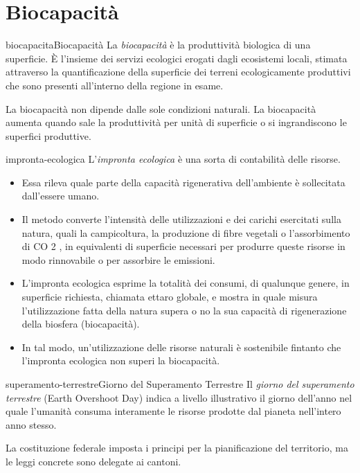 \documentclass[preview]{standalone}
\begin{document}
\genpage

\section{Biocapacità}

\begin{snippetdefinition}{biocapacita}{Biocapacità}
    La \textit{biocapacità} è la produttività biologica di una superficie. È
    l'insieme dei servizi ecologici erogati dagli ecosistemi locali, stimata
    attraverso la quantificazione della superficie dei terreni
    ecologicamente produttivi che sono presenti all'interno della regione
    in esame.
\end{snippetdefinition}

\begin{plainhtml}
    La biocapacità non dipende dalle sole condizioni naturali.
    La biocapacità aumenta quando sale la produttività per unità di
    superficie o si ingrandiscono le superfici produttive.
\end{plainhtml}

\begin{snippet}{impronta-ecologica}
    L'\textit{impronta ecologica} è una sorta di contabilità delle risorse.
    \begin{itemize}
        \item Essa rileva quale parte della capacità rigenerativa
            dell'ambiente è sollecitata dall'essere umano.
        \item Il metodo converte l'intensità delle utilizzazioni e dei
            carichi esercitati sulla natura, quali la campicoltura, la
            produzione di fibre vegetali o l'assorbimento di CO 2 , in
            equivalenti di superficie necessari per produrre queste
            risorse in modo rinnovabile o per assorbire le emissioni.
        \item L'impronta ecologica esprime la totalità dei consumi, di qualunque
            genere, in superficie richiesta, chiamata ettaro globale, e mostra
            in quale misura l'utilizzazione fatta della natura supera o no la sua
            capacità di rigenerazione della biosfera (biocapacità). 
        \item In tal modo, un'utilizzazione delle risorse naturali è sostenibile
            fintanto che l'impronta ecologica non superi la biocapacità.
    \end{itemize}
\end{snippet}

\begin{snippetdefinition}{superamento-terrestre}{Giorno del Superamento Terrestre}
    Il \textit{giorno del superamento terrestre} (Earth Overshoot Day)
    indica a livello illustrativo il giorno dell'anno nel quale l'umanità
    consuma interamente le risorse prodotte dal pianeta nell'intero anno stesso. 
\end{snippetdefinition}

\begin{plainhtml}
    La costituzione federale imposta i principi per la pianificazione del territorio,
    ma le leggi concrete sono delegate ai cantoni.
\end{plainhtml}
\end{document}
